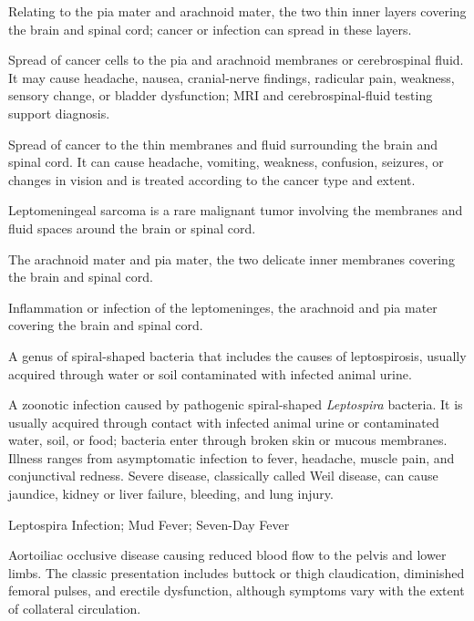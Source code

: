  Relating to the pia mater and arachnoid mater, the two thin inner layers covering the brain and spinal cord; cancer or infection can spread in these layers.

 Spread of cancer cells to the pia and arachnoid membranes or cerebrospinal fluid. It may cause headache, nausea, cranial-nerve findings, radicular pain, weakness, sensory change, or bladder dysfunction; MRI and cerebrospinal-fluid testing support diagnosis.

 Spread of cancer to the thin membranes and fluid surrounding the brain and spinal cord. It can cause headache, vomiting, weakness, confusion, seizures, or changes in vision and is treated according to the cancer type and extent.

 Leptomeningeal sarcoma is a rare malignant tumor involving the membranes and fluid spaces around the brain or spinal cord.

 The arachnoid mater and pia mater, the two delicate inner membranes covering the brain and spinal cord.

 Inflammation or infection of the leptomeninges, the arachnoid and pia mater covering the brain and spinal cord.

 A genus of spiral-shaped bacteria that includes the causes of leptospirosis, usually acquired through water or soil contaminated with infected animal urine.

 A zoonotic infection caused by pathogenic spiral-shaped \textit{Leptospira} bacteria. It is usually acquired through contact with infected animal urine or contaminated water, soil, or food; bacteria enter through broken skin or mucous membranes. Illness ranges from asymptomatic infection to fever, headache, muscle pain, and conjunctival redness. Severe disease, classically called Weil disease, can cause jaundice, kidney or liver failure, bleeding, and lung injury.

\synonyms
Leptospira Infection; Mud Fever; Seven-Day Fever

 Aortoiliac occlusive disease causing reduced blood flow to the pelvis and lower limbs.
The classic presentation includes buttock or thigh claudication, diminished femoral
pulses, and erectile dysfunction, although symptoms vary with the extent of collateral
circulation.

